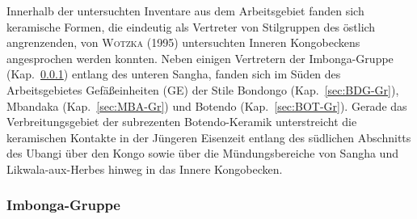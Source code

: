 Innerhalb der untersuchten Inventare aus dem Arbeitsgebiet fanden sich keramische Formen, die eindeutig als Vertreter von Stilgruppen des östlich angrenzenden, von \textsc{Wotzka} (1995) untersuchten Inneren Kongobeckens angesprochen werden konnten. Neben einigen Vertretern der Imbonga-Gruppe (Kap.~\ref{sec:IMB-Gr}) entlang des unteren \mbox{Sangha}, fanden sich im Süden des Arbeitsgebietes Gefäßeinheiten (GE) der Stile Bondongo (Kap.~\ref{sec:BDG-Gr}), Mbandaka (Kap.~\ref{sec:MBA-Gr}) und Botendo (Kap.~\ref{sec:BOT-Gr}). Gerade das Verbreitungsgebiet der subrezenten Botendo-Keramik unterstreicht die keramischen Kontakte in der Jüngeren Eisenzeit entlang des südlichen Abschnitts des \mbox{Ubangi} über den Kongo sowie über die Mündungsbereiche von \mbox{Sangha} und \mbox{Likwala}-\mbox{aux}-\mbox{Herbes} hinweg in das Innere Kongobecken.

\subsubsection{Imbonga-Gruppe}\label{sec:IMB-Gr}

